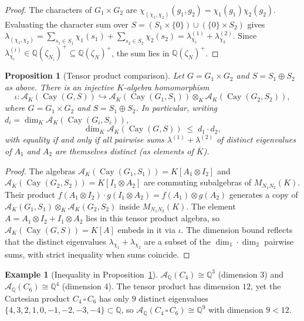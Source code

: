\documentclass[12pt]{amsart}
\numberwithin{equation}{section}
\theoremstyle{plain}
\newtheorem{proposition}[theorem]{Proposition}
\theoremstyle{definition}
\newtheorem{example}[theorem]{Example}
\DeclareMathOperator{\Cay}{Cay}
\newcommand{\Q}{\mathbb{Q}}
\newcommand{\calA}{\mathcal{A}}
\begin{document}
\begin{proof}
The characters of $G_1 \times G_2$ are $\chi_{(\chi_1,\chi_2)}(g_1,g_2)
= \chi_1(g_1)\chi_2(g_2)$.  Evaluating the character sum over
$S = (S_1 \times \{0\}) \cup (\{0\} \times S_2)$ gives
$\lambda_{(\chi_1,\chi_2)} = \sum_{s_1 \in S_1} \chi_1(s_1)
+ \sum_{s_2 \in S_2} \chi_2(s_2)
= \lambda_{\chi_1}^{(1)} + \lambda_{\chi_2}^{(2)}$.
Since $\lambda_{\chi_i}^{(i)} \in \Q(\zeta_{N_i})^+ \subseteq \Q(\zeta_N)^+$,
the sum lies in $\Q(\zeta_N)^+$.
\end{proof}

\begin{proposition}[Tensor product comparison]
\label{prop:tensor}
Let $G = G_1 \times G_2$ and $S = S_1 \oplus S_2$ as above.  There is an
injective $K$-algebra homomorphism
\[
\iota : \calA_K(\Cay(G,S)) \hookrightarrow
\calA_K(\Cay(G_1,S_1)) \otimes_K \calA_K(\Cay(G_2,S_2)),
\]
where $G = G_1\times G_2$ and $S = S_1\oplus S_2$.
In particular, writing $d_i = \dim_K \calA_K(\Cay(G_i,S_i))$,
\[
  \dim_K \calA_K(\Cay(G,S)) \;\le\; d_1 \cdot d_2,
\]
with equality if and only if all pairwise sums $\lambda^{(1)} +
\lambda^{(2)}$ of distinct eigenvalues of $A_1$ and $A_2$
are themselves distinct (as elements of $\overline{K}$).
\end{proposition}

\begin{proof}
The algebras $\calA_K(\Cay(G_1,S_1)) = K[A_1 \otimes I_2]$ and
$\calA_K(\Cay(G_2,S_2)) = K[I_1 \otimes A_2]$ are commuting subalgebras
of $M_{N_1 N_2}(K)$.  Their product $f(A_1 \otimes I_2) \cdot g(I_1
\otimes A_2) = f(A_1) \otimes g(A_2)$ generates a copy of
$\calA_K(G_1,S_1) \otimes_K \calA_K(G_2,S_2)$ inside $M_{N_1 N_2}(K)$.
The element $A = A_1 \otimes I_2 + I_1 \otimes A_2$ lies in this tensor
product algebra, so $\calA_K(\Cay(G,S)) = K[A]$ embeds in it via $\iota$.
The dimension bound reflects that the distinct eigenvalues
$\lambda_{\chi_1} + \lambda_{\chi_2}$ are a subset of the
$\dim_1 \cdot \dim_2$ pairwise sums, with strict inequality when sums
coincide.
\end{proof}

\begin{example}[Inequality in Proposition~\ref{prop:tensor}]
$\calA_\Q(C_4) \cong \Q^3$ (dimension $3$) and $\calA_\Q(C_6) \cong \Q^4$
(dimension $4$).  The tensor product has dimension $12$, yet the Cartesian
product $C_4 \,\square\, C_6$ has only $9$ distinct eigenvalues
$\{4,3,2,1,0,-1,-2,-3,-4\} \subset \Q$, so
$\calA_\Q(C_4 \,\square\, C_6) \cong \Q^9$ with dimension $9 < 12$.
\end{example}
\end{document}

